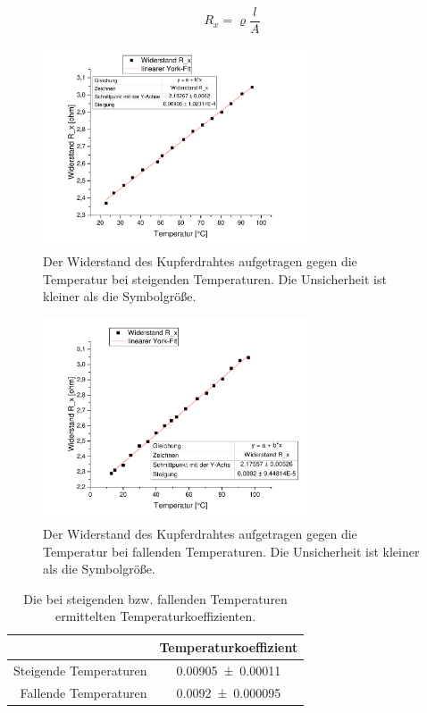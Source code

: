 \documentclass[
	a4paper,
	12pt,
	pagesize,
	ngerman
]{scrartcl}
\begin{document}
	\begin{equation}
	R_x =\varrho \frac{l}{A}
	\label{prop}
	\end{equation}
	\begin{figure}[H]
		\includegraphics[width=0.7\textwidth]{Temp_Steig}
		\centering
		\caption{Der Widerstand des Kupferdrahtes aufgetragen gegen die Temperatur bei steigenden Temperaturen. Die Unsicherheit ist kleiner als die Symbolgröße.}
		\label{Temp_Steig}
		\centering
	\end{figure}
	\begin{figure}[H]
		\includegraphics[width=0.7\textwidth]{Temp_Fall}
		\centering
		\caption{Der Widerstand des Kupferdrahtes aufgetragen gegen die Temperatur bei fallenden Temperaturen. Die Unsicherheit ist kleiner als die Symbolgröße.}
		\label{Temp_Fall}
		\centering
	\end{figure}
	\begin{table}[H]
		\centering
		\begin{tabular}{ r | c }
			&Temperaturkoeffizient \\ \hline
			Steigende Temperaturen& \SI{0,00905\pm 0,00011}{}\\
			Fallende Temperaturen & \SI{0,0092\pm 0,000095}{}\\
		\end{tabular}
		\caption{Die bei steigenden bzw. fallenden Temperaturen ermittelten Temperaturkoeffizienten.}
		\label{Koeff} 
	\end{table}
\end{document}
